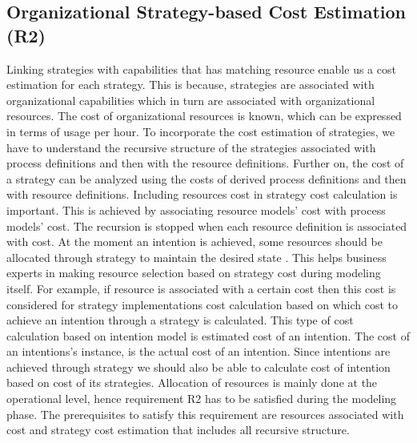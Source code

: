\subsection{Organizational Strategy-based Cost Estimation (R2)}
Linking strategies with capabilities that has matching resource enable us a cost estimation for each strategy. This is because, strategies are associated with organizational capabilities which in turn are associated with organizational resources. The cost of organizational resources is known, which can be expressed in terms of usage per hour. To incorporate the cost estimation of strategies, we have to understand the recursive structure of the strategies associated with process definitions and then with the resource definitions. Further on, the cost of a strategy can be analyzed using the costs of derived process definitions and then with resource definitions. Including resources cost in strategy cost calculation is important. This is achieved by associating resource models' cost with process models' cost. The recursion is stopped when each resource definition is associated with cost. At the moment an intention is achieved, some resources should be allocated through strategy to maintain the desired state \cite{Mandic2010}. This helps business experts in making resource selection based on strategy cost during modeling itself. For example, if resource is associated with a certain cost then this cost is considered for strategy implementations cost calculation based on which cost to achieve an intention through a strategy is calculated. This type of cost calculation based on intention model is estimated cost of an intention. The cost of an intentions's instance, is the actual cost of an intention. Since intentions are achieved through strategy we should also be able to calculate cost of intention based on cost of its strategies. Allocation of resources is mainly done at the operational level, hence requirement R2 has to be satisfied during the modeling phase. The prerequisites to satisfy this requirement are resources associated with cost and strategy cost estimation that includes all recursive structure.

